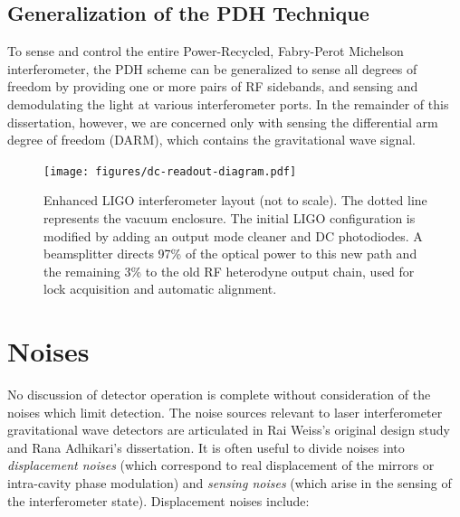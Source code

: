 \subsection{Generalization of the PDH Technique}

To sense and control the entire Power-Recycled, Fabry-Perot Michelson
interferometer, the PDH scheme can be generalized to sense all degrees
of freedom by providing one or more pairs of RF sidebands, and sensing
and demodulating the light at various interferometer ports.  In the
remainder of this dissertation, however, we are concerned only with
sensing the differential arm degree of freedom (DARM), which contains
the gravitational wave signal.

\begin{figure}
\texttt{[image: figures/dc-readout-diagram.pdf]}
\caption[Enhanced LIGO interferometer
  layout]{\label{fig:dc-readout-ifo}Enhanced LIGO interferometer
  layout (not to scale).  The dotted line represents the vacuum
  enclosure. The initial LIGO configuration is modified by adding an
  output mode cleaner and DC photodiodes.  A beamsplitter directs 97\%
  of the optical power to this new path and the remaining 3\% to the
  old RF heterodyne output chain, used for lock acquisition and
  automatic alignment.}
\end{figure}

\section{Noises}

No discussion of detector operation is complete without consideration of the
noises which limit detection.  The noise sources relevant to laser
interferometer gravitational wave detectors are articulated in Rai
Weiss's original design study\cite{Weiss1972Electromagnetically} and
Rana Adhikari's dissertation\cite{RanaThesis}.  It is often useful to
divide noises into \emph{displacement noises} (which correspond to
real displacement of the mirrors or intra-cavity phase modulation) and
\emph{sensing noises} (which arise in the sensing of the interferometer 
state).  Displacement noises include:

